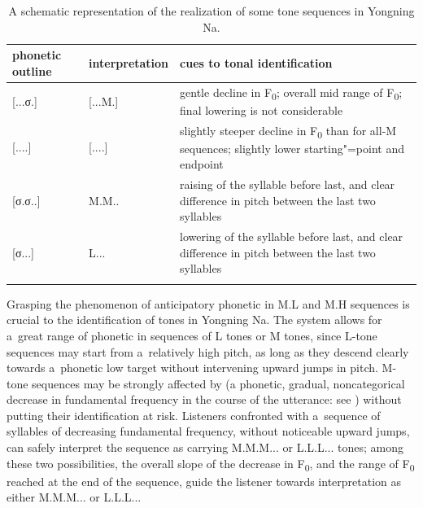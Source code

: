 \begin{table}%
	\caption{\label{tab:aschematicrepresentationoftherealizationofsometonesequencesinyongningna}A schematic representation of the realization of some tone sequences in Yongning Na.}
{\renewcommand{\arraystretch}{1.35}	
\begin{tabularx}{\textwidth}{ P{18mm} l Q }
		\lsptoprule
		phonetic outline & interpretation & cues to tonal identification\\\midrule
		{[...σ.]} & [...M.] & gentle decline in F\textsubscript{0}; overall mid range of F\textsubscript{0}; final lowering is not considerable\\
		{[....]} & {[....]} & slightly steeper decline in F\textsubscript{0} than for all-M sequences; slightly lower starting"=point and endpoint\\
		{[σ.σ..]} & M.M.. & raising of the syllable before last, and clear difference in pitch between the last two syllables\\
		{[σ...]} & L... & lowering of the syllable before last, and clear difference in pitch between the
		last two syllables\\
		\lspbottomrule
	\end{tabularx}}
\end{table}

Grasping the phenomenon of anticipatory phonetic  in M.L and M.H sequences is crucial
to the identification of tones in Yongning Na. The system allows for a~great range of phonetic
 in sequences of L tones or M tones, since L-tone sequences may start from a~relatively high
pitch, as long as they descend clearly towards a~phonetic low target without intervening upward
jumps in pitch. M-tone sequences may be strongly affected by  (a phonetic, gradual,
noncategorical decrease in fundamental frequency in the course of the
utterance: see
)
without putting their identification at risk. Listeners confronted with a~sequence of syllables of
decreasing fundamental frequency, without noticeable upward jumps, can
safely interpret the sequence as carrying M.M.M... or L.L.L... tones; among these two possibilities, the overall slope of the
decrease in F\textsubscript{0}, and the range of F\textsubscript{0} reached at
the end of the sequence, guide the listener towards interpretation as either M.M.M... or L.L.L...

